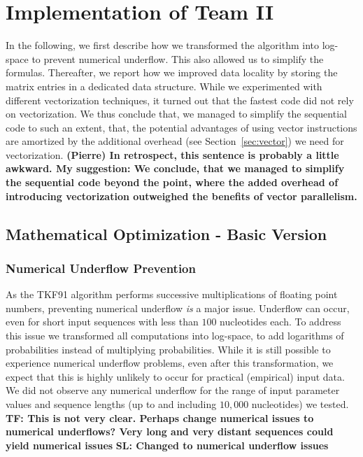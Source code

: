 \documentclass[runningheads,a4paper]{llncs}
\begin{document}
\section{Implementation of Team II}
\label{sec:implementation-2}

In the following, we first describe how we transformed the algorithm into log-space to prevent numerical underflow.
This also allowed us to simplify the formulas.
Thereafter, we report how we improved data locality by storing the matrix entries in a dedicated data structure.
While we experimented with different vectorization techniques, it turned out that the fastest code did not rely on vectorization.
We thus conclude that, we managed to simplify the sequential code to such an extent, that, the potential advantages of using vector instructions
are amortized by the additional overhead (see Section~\ref{sec:vector}) we need for vectorization.
\textbf{(Pierre) In retrospect, this sentence is probably a little awkward. My suggestion:
 We conclude, that we managed to simplify the sequential code beyond the point, where the added overhead of introducing vectorization outweighed the benefits of vector parallelism.}

\subsection{Mathematical Optimization - Basic Version}

\subsubsection{Numerical Underflow Prevention}
\label{sec:log}

As the TKF91 algorithm performs successive multiplications of floating point numbers, preventing numerical underflow
{\em is} a major issue. Underflow can occur, even for short input sequences with less than $100$ nucleotides each.
To address this issue we transformed all computations into log-space, to add logarithms of probabilities instead of multiplying probabilities.
While it is still possible to experience numerical underflow problems, even after this transformation,
we expect that this is highly unlikely to occur for practical (empirical) input data.
We did not observe any numerical underflow for the range of input parameter values and sequence lengths (up to and including $10,000$ nucleotides)
we tested. \textbf{TF: This is not very clear. Perhaps change numerical issues to numerical underflows? Very long and very distant sequences could yield numerical issues} \textbf{SL: Changed to numerical underflow issues}
\end{document}

